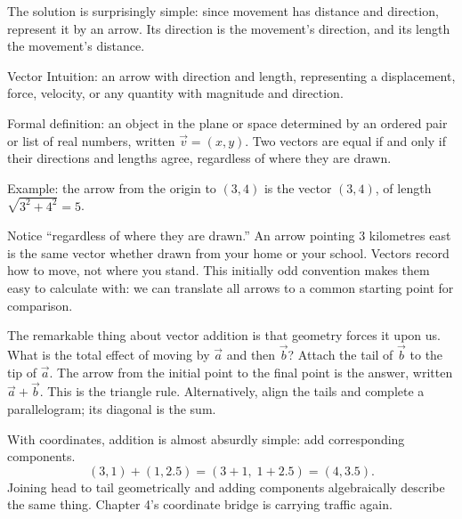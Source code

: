 The solution is surprisingly simple: since movement has distance and direction, represent it by an arrow. Its direction is the movement's direction, and its length the movement's distance.

\begin{shuyu}{Vector}
Intuition: an arrow with direction and length, representing a displacement, force, velocity, or any quantity with magnitude and direction.

Formal definition: an object in the plane or space determined by an ordered pair or list of real numbers, written $\vec{v}=(x,y)$. Two vectors are equal if and only if their directions and lengths agree, regardless of where they are drawn.

Example: the arrow from the origin to $(3,4)$ is the vector $(3,4)$, of length $\sqrt{3^2+4^2}=5$.
\end{shuyu}

Notice ``regardless of where they are drawn.'' An arrow pointing $3$ kilometres east is the same vector whether drawn from your home or your school. Vectors record how to move, not where you stand. This initially odd convention makes them easy to calculate with: we can translate all arrows to a common starting point for comparison.

The remarkable thing about vector addition is that geometry forces it upon us. What is the total effect of moving by $\vec{a}$ and then $\vec{b}$? Attach the tail of $\vec{b}$ to the tip of $\vec{a}$. The arrow from the initial point to the final point is the answer, written $\vec{a}+\vec{b}$. This is the triangle rule. Alternatively, align the tails and complete a parallelogram; its diagonal is the sum.

\begin{center}
\end{center}

With coordinates, addition is almost absurdly simple: add corresponding components.
\[
(3,1)+(1,2.5)=(3+1,\;1+2.5)=(4,3.5).
\]
Joining head to tail geometrically and adding components algebraically describe the same thing. Chapter 4's coordinate bridge is carrying traffic again.

